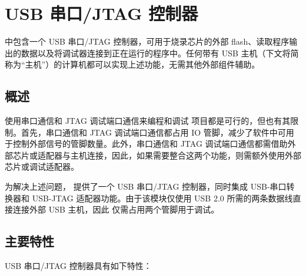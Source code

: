 \documentclass[main\_\_CN.tex]{subfiles}
\begin{document}

\ifglobal
\else
    \listoftodos
    {\let\clearpage\relax \listofdonetodos}
    \tableofcontents
\fi



\hypertarget{usbserialjtag}{}
\chapter{USB 串口/JTAG 控制器}
\label{mod:usbserialjtag}


\chipname{} 中包含一个 USB 串口/JTAG 控制器，可用于烧录芯片的外部 flash、读取程序输出的数据以及将调试器连接到正在运行的程序中。任何带有 USB 主机（下文将简称为“主机”）的计算机都可以实现上述功能，无需其他外部组件辅助。

\section{概述}

使用串口通信和 JTAG 调试端口通信来编程和调试 \chipname{} 项目都是可行的，但也有其限制。首先，串口通信和 JTAG 调试端口通信都占用 IO 管脚，减少了软件中可用于控制外部信号的管脚数量。此外，串口通信和 JTAG 调试端口通信都需借助外部芯片或适配器与主机连接，因此，如果需要整合这两个功能，则需额外使用外部芯片或调试适配器。

为解决上述问题，\chipname{} 提供了一个 USB 串口/JTAG 控制器，同时集成 USB-串口转换器和 USB-JTAG 适配器功能。由于该模块仅使用 USB 2.0 所需的两条数据线直接连接外部 USB 主机，因此 \chipname{} 仅需占用两个管脚用于调试。

\section{主要特性}
\label{sec:usbserialjtag-features}

USB 串口/JTAG 控制器具有如下特性：
\end{document}
